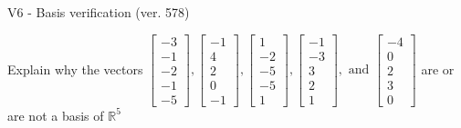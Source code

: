 \begin{exercise}
  \begin{exerciseTitle}V6 - Basis verification (ver. 578)\end{exerciseTitle}
  \begin{exerciseStatement}
    Explain why the vectors \(\left[\begin{array}{r}
-3 \\
-1 \\
-2 \\
-1 \\
-5
\end{array}\right] , \left[\begin{array}{r}
-1 \\
4 \\
2 \\
0 \\
-1
\end{array}\right] , \left[\begin{array}{r}
1 \\
-2 \\
-5 \\
-5 \\
1
\end{array}\right] , \left[\begin{array}{r}
-1 \\
-3 \\
3 \\
2 \\
1
\end{array}\right] , \text{ and } \left[\begin{array}{r}
-4 \\
0 \\
2 \\
3 \\
0
\end{array}\right]\) are or are not a basis of \(\mathbb{R}^5\)	



\end{exerciseStatement}
\end{exercise}
